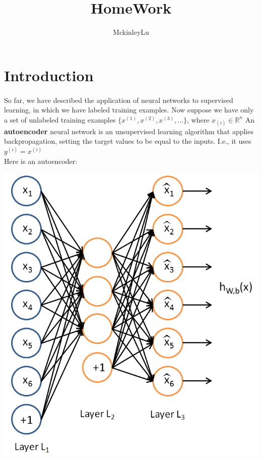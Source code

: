 \documentclass[conference]{IEEEtran}
\begin{document}
\title{HomeWork}

\author{MckinleyLu}


\maketitle


\section{Introduction}
\paragraph{}
So far, we have described the application of neural networks to supervised learning, 
in which we have labeled training examples. 
Now suppose we have only a set of unlabeled 
training examples $\{x^{(1)},x^{(2)},x^{(3)},\dots\}$, where $x_{(i)} \in \mathbb{R}^n $
An \textbf{autoencoder} neural network is an unsupervised learning algorithm that applies backpropagation, 
setting the target values to be equal to the inputs. I.e.,  it uses 
$y^{(i)}=x^{(i)}$\\
Here is an autoencoder:\\
\centerline{\includegraphics[scale=0.2]{Autoencoder636.png}}
\end{document}
